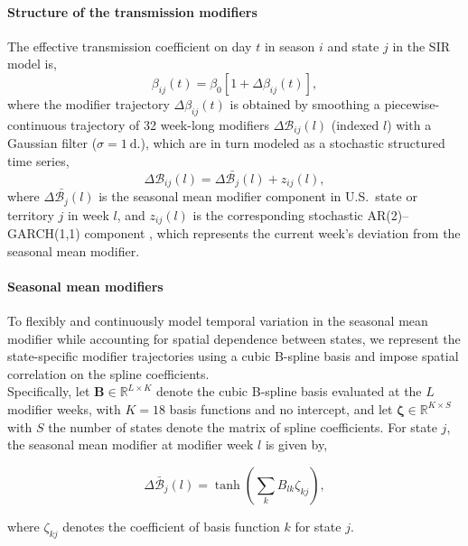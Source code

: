 \documentclass[11pt]{article}
\begin{document}
\paragraph{Structure of the transmission modifiers} The effective transmission coefficient on day $t$ in season $i$ and state $j$ in the SIR model is,
\begin{equation}
\beta_{ij}(t) = \beta_0 \left[ 1 + \Delta \beta_{ij}(t) \right],
\end{equation}
where the modifier trajectory $\Delta \beta_{ij}(t)$ is obtained by smoothing a piecewise-continuous trajectory of 32 week-long modifiers $\Delta \mathcal{B}_{ij}(l)$ (indexed $l$) with a Gaussian filter ($\sigma = 1~\text{d.}$), which are in turn modeled as a stochastic structured time series,
\begin{equation}
    \Delta \mathcal{B}_{ij} (l) = \Delta\bar{\mathcal{B}_{j}}(l) + z_{ij}(l),
\end{equation}
where $\Delta\bar{\mathcal{B}_{j}}(l)$ is the seasonal mean modifier component in U.S.\ state or territory $j$ in week $l$, and $z_{ij}(l)$ is the corresponding stochastic AR(2)--GARCH(1,1) component \citep{bollerslev1986}, which represents the current week's deviation from the seasonal mean modifier.


\paragraph{Seasonal mean modifiers}

To flexibly and continuously model temporal variation in the seasonal mean modifier while accounting for spatial dependence between states, we represent the state-specific modifier trajectories using a cubic B-spline basis and impose spatial correlation on the spline coefficients.\\


Specifically, let $\bm{B} \in \mathbb{R}^{L \times K}$ denote the cubic B-spline basis evaluated at the $L$ modifier weeks, with $K = 18$ basis functions and no intercept, and let $\bm{\zeta} \in \mathbb{R}^{K \times S}$ with $S$ the number of states denote the matrix of spline coefficients. For state $j$, the seasonal mean modifier at modifier week $l$ is given by,

\begin{equation}
\Delta \bar{\mathcal{B}}_j(l) = \tanh \left( \sum_{k} B_{lk}\zeta_{kj} \right),
\end{equation}


where $\zeta_{kj}$ denotes the coefficient of basis function $k$ for state $j$.\\
\end{document}
